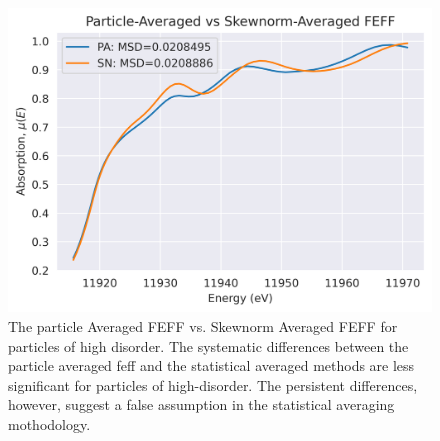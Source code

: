 \begin{figure}[!h]
	\centering
	\label{fig:pa-vs-sknm-feff-bigmsd}
	\includegraphics[width=.75\linewidth]{Chapters/Figures/PA-vs-skewnorm-newvals-large-msd.png}
	\caption[Particle-Averaged vs. Skewnorm-Averaged FEFF High-Disorder]{The particle Averaged FEFF vs. Skewnorm Averaged FEFF for particles of high disorder. The systematic differences between the particle averaged feff and the statistical averaged methods are less significant for particles of high-disorder. The persistent differences, however, suggest a false assumption in the statistical averaging mothodology.}
\end{figure}

